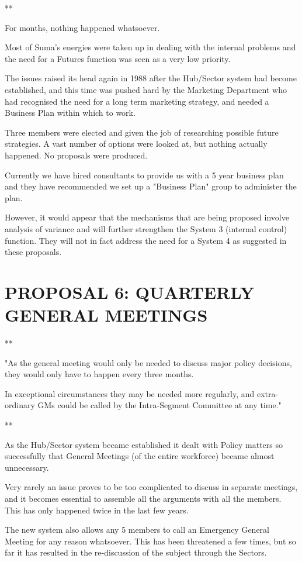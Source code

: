 **

For months, nothing happened whatsoever.

Most of Suma's energies were taken up in dealing with the internal problems and the need for a Futures function was seen as a very low priority.

The issues raised its head again in 1988 after the Hub/Sector system had become established, and this time was pushed hard by the Marketing Department who had recognised the need for a long term marketing strategy, and needed a Business Plan within which to work.

Three members were elected and given the job of researching possible future strategies. A vast number of options were looked at, but nothing actually happened. No proposals were produced.

Currently we have hired consultants to provide us with a 5 year business plan and they have recommended we set up a "Business Plan" group to administer the plan.

However, it would appear that the mechanisms that are being proposed involve analysis of variance and will further strengthen the System 3 (internal control) function. They will not in fact address the need for a System 4 as suggested in these proposals.

\section*{PROPOSAL 6: QUARTERLY GENERAL MEETINGS}
**

"As the general meeting would only be needed to discuss major policy decisions, they would only have to happen every three months.

In exceptional circumstances they may be needed more regularly, and extra-ordinary GMs could be called by the Intra-Segment Committee at any time."

**

As the Hub/Sector system became established it dealt with Policy matters so successfully that General Meetings (of the entire workforce) became almost unnecessary.

Very rarely an issue proves to be too complicated to discuss in separate meetings, and it becomes essential to assemble all the arguments with all the members. This has only happened twice in the last few years.

The new system also allows any 5 members to call an Emergency General Meeting for any reason whatsoever. This has been threatened a few times, but so far it has resulted in the re-discussion of the subject through the Sectors.

